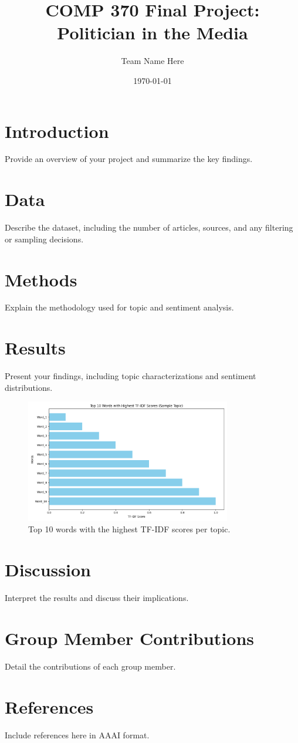 \documentclass[12pt]{article}
\title{COMP 370 Final Project: Politician in the Media}
\author{Team Name Here}
\date{\today}
\begin{document}
\maketitle

\section{Introduction}
Provide an overview of your project and summarize the key findings.

\section{Data}
Describe the dataset, including the number of articles, sources, and any filtering or sampling decisions.

\section{Methods}
Explain the methodology used for topic and sentiment analysis.

\section{Results}
Present your findings, including topic characterizations and sentiment distributions.

\begin{figure}[H]
    \centering
    \includegraphics[width=0.8\textwidth]{./figures/top_tfidf_words.png}
    \caption{Top 10 words with the highest TF-IDF scores per topic.}
    \label{fig:tfidf}
\end{figure}

\section{Discussion}
Interpret the results and discuss their implications.

\section{Group Member Contributions}
Detail the contributions of each group member.

\section{References}
Include references here in AAAI format.
\end{document}

